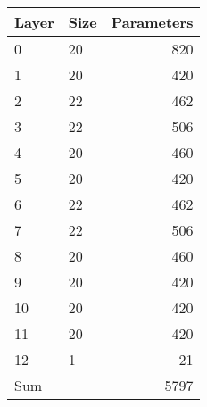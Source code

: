 \begin{tabular}{llr}
\toprule
 Layer   & Size   &   Parameters \\
\midrule
 0       & 20     &          820 \\
 1       & 20     &          420 \\
 2       & 22     &          462 \\
 3       & 22     &          506 \\
 4       & 20     &          460 \\
 5       & 20     &          420 \\
 6       & 22     &          462 \\
 7       & 22     &          506 \\
 8       & 20     &          460 \\
 9       & 20     &          420 \\
 10      & 20     &          420 \\
 11      & 20     &          420 \\
 12      & 1      &           21 \\
 Sum     &        &         5797 \\
\bottomrule
\end{tabular}
